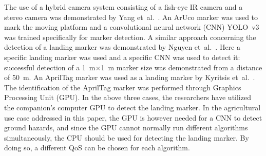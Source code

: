 \documentclass[conference, onecolumn, draftclsnofoot]{IEEEtran}
\begin{document}




The use of a hybrid camera system consisting of a fish-eye IR camera
and a stereo camera was demonstrated by Yang
et~al.~\cite{yang2018hybrid}. An ArUco marker was used to mark the
moving platform and a convolutional neural network (CNN) YOLO~v3 was
trained specifically for marker detection. A similar approach
concerning the detection of a landing marker was demonstrated by
Nguyen et~al.~\cite{nguyen2018lightdenseyolo}. Here a specific landing
marker was used and a specific CNN was used to detect it: successful
detection of a \SI{1}{\m}$\times$\SI{1}{\m} marker size was demonstrated from a
distance of \SI{50}{\m}. An AprilTag marker was used as a landing marker by
Kyritsis et~al.~\cite{kyristsis2016towards}. The identification of the AprilTag marker
was performed through Graphics Processing Unit (GPU). In the above three cases, the researchers
have utilized the companion's computer GPU to detect the landing
marker. In the agricultural use case addressed in this paper, the GPU
is however needed for a CNN to detect ground hazards, and since the
GPU cannot normally run different algorithms simultaneously,
%
%
the CPU should be used for detecting the landing marker. By doing so,
a different QoS can be chosen for each algorithm.  
\end{document}
